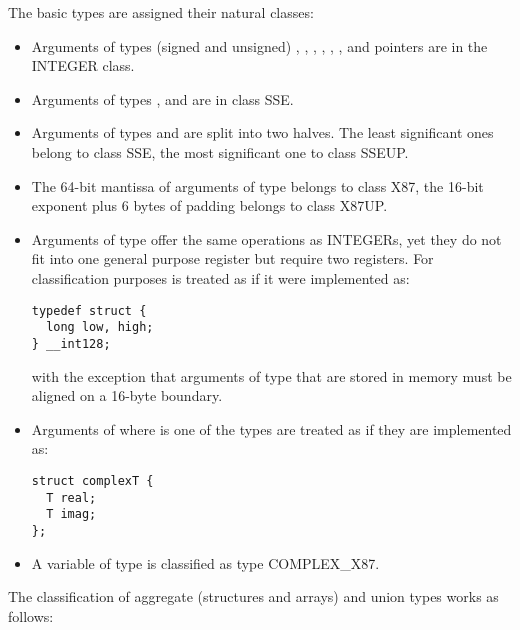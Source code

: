 The basic types are assigned their natural classes:
\begin{itemize}
\item Arguments of types (signed and unsigned) , ,
  , , , , and
  pointers are in the INTEGER class.
\item Arguments of types ,  and 
  are in class SSE.
\item Arguments of types  and  are split
  into two halves.  The least significant ones belong to class SSE, the
  most significant one to class SSEUP.
\item The 64-bit mantissa of arguments of type 
  belongs to class X87, the 16-bit exponent plus 6 bytes of padding
  belongs to class X87UP.
\item Arguments of type  offer the same operations as
INTEGERs, yet they do not fit into one general purpose register but
require two registers.  For
classification purposes  is treated as if it
were implemented as:
\begin{verbatim}
typedef struct {
  long low, high;
} __int128;
\end{verbatim}
with the exception that arguments of type  that are
stored in memory must be aligned on a 16-byte boundary.

\item Arguments of  where  is one of the types
   are treated as if they are
  implemented as:
\begin{verbatim}
struct complexT {
  T real;
  T imag;
};
\end{verbatim}
\item A variable of type  is classified as
  type COMPLEX\_X87.
\end{itemize}


The classification of aggregate (structures and arrays) and union
types works as follows:

